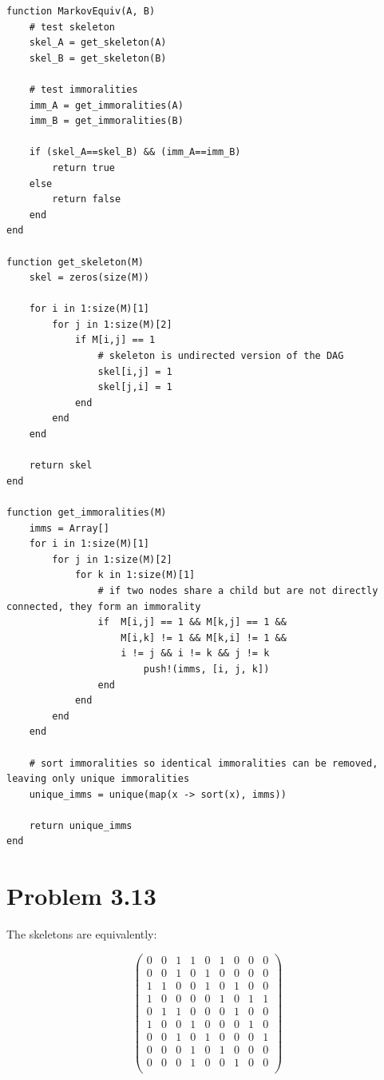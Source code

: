 \documentclass[11pt,a4paper,oneside]{report}
\begin{document}
\begin{lstlisting}
function MarkovEquiv(A, B)
    # test skeleton
    skel_A = get_skeleton(A)
    skel_B = get_skeleton(B)

    # test immoralities
    imm_A = get_immoralities(A)
    imm_B = get_immoralities(B)

    if (skel_A==skel_B) && (imm_A==imm_B)
        return true
    else
        return false
    end
end

function get_skeleton(M)
    skel = zeros(size(M))

    for i in 1:size(M)[1]
        for j in 1:size(M)[2]
            if M[i,j] == 1
                # skeleton is undirected version of the DAG
                skel[i,j] = 1
                skel[j,i] = 1
            end
        end
    end

    return skel
end

function get_immoralities(M)
    imms = Array[]
    for i in 1:size(M)[1]
        for j in 1:size(M)[2]
            for k in 1:size(M)[1]
                # if two nodes share a child but are not directly connected, they form an immorality
                if  M[i,j] == 1 && M[k,j] == 1 &&
                    M[i,k] != 1 && M[k,i] != 1 && 
                    i != j && i != k && j != k
                        push!(imms, [i, j, k])
                end
            end
        end
    end

    # sort immoralities so identical immoralities can be removed, leaving only unique immoralities
    unique_imms = unique(map(x -> sort(x), imms))

    return unique_imms
end
\end{lstlisting}


\section*{Problem 3.13}
The skeletons are equivalently:

\begin{equation}
\begin{pmatrix}
 0 & 0 & 1 & 1 & 0 & 1 & 0 & 0 & 0 \\
 0 & 0 & 1 & 0 & 1 & 0 & 0 & 0 & 0 \\
 1 & 1 & 0 & 0 & 1 & 0 & 1 & 0 & 0 \\
 1 & 0 & 0 & 0 & 0 & 1 & 0 & 1 & 1 \\
 0 & 1 & 1 & 0 & 0 & 0 & 1 & 0 & 0 \\
 1 & 0 & 0 & 1 & 0 & 0 & 0 & 1 & 0 \\
 0 & 0 & 1 & 0 & 1 & 0 & 0 & 0 & 1 \\
 0 & 0 & 0 & 1 & 0 & 1 & 0 & 0 & 0 \\
 0 & 0 & 0 & 1 & 0 & 0 & 1 & 0 & 0 \\
\end{pmatrix}
\end{equation}
\end{document}
